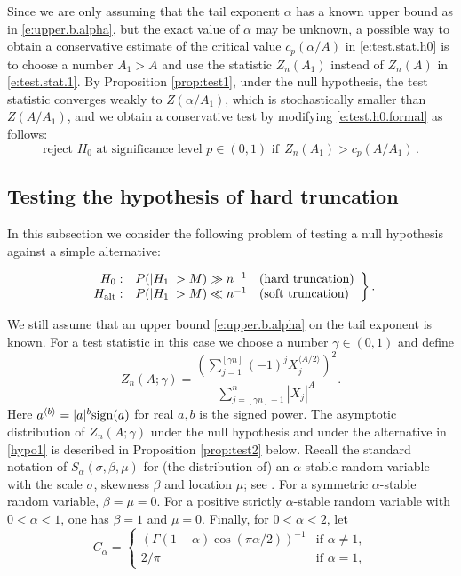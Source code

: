\documentclass[11pt]{amsart}
\numberwithin{equation}{section}
\begin{document}
Since we are only  assuming that the tail exponent
$\alpha$ has a known upper bound as in \eqref{e:upper.b.alpha}, but
the exact value of $\alpha$ may be unknown, a possible way to obtain a
conservative estimate of the critical value $c_p(\alpha/A)$ in
\eqref{e:test.stat.h0} is to choose a number $A_1>A$ and use the
statistic $Z_n(A_1)$ instead of $Z_n(A)$ in
\eqref{e:test.stat.1}. By Proposition \ref{prop:test1},
under the null hypothesis, the test statistic
converges weakly to $Z(\alpha/A_1)$, which is stochastically smaller
than $Z(A/A_1)$, and we  obtain a conservative test by
modifying \eqref{e:test.h0.formal} as follows:
\begin{equation} \label{e:test.h0.mod}
\text{reject $H_0$ at significance level $p\in (0,1)$ if} \ \
Z_n(A_1) >c_p(A/A_1)\,.
\end{equation}

\subsection{Testing the hypothesis of hard truncation}\label{test2}

In this subsection we consider the following problem of testing a null
hypothesis against a simple alternative:

\begin{equation}\label{hypo1}
\left.\begin{array}{rcl}
H_0:&P(|H_1|>M)\gg n^{-1}&\mbox{(hard truncation)}\\
H_{\rm alt}:&P(|H_1|>M)\ll n^{-1}&\mbox{(soft truncation)}
\end{array}\right\}.
\end{equation}

We still assume that an upper bound \eqref{e:upper.b.alpha} on the
tail exponent is known. For a test statistic in this case we
choose a number $\gamma\in(0,1)$ and define
\begin{equation} \label{e:test.stat.2}
Z_n(A;\gamma)=\frac{\left(\sum_{j=1}^{[\gamma
      n]}(-1)^jX_{j}^{\langle A/2\rangle}\right)^2}{\sum_{j=[\gamma
      n]+1}^n|X_{j}|^A}.
\end{equation}
Here $a^{\langle b\rangle}= |a|^b{\rm sign}(a)$ for real $a,b$ is the
signed power. The asymptotic distribution of $Z_n(A;\gamma)$
under the null hypothesis and under the alternative in \eqref{hypo1}
is described in Proposition \ref{prop:test2} below. Recall the
standard notation of $S_\alpha(\sigma,\beta,\mu)$ for (the
distribution of) an
$\alpha$-stable random variable with the scale $\sigma$, skewness
$\beta$ and location $\mu$; see \cite{samorodnitsky:taqqu:1994}. For a
symmetric $\alpha$-stable random variable, $\beta=\mu=0$. For a
positive strictly $\alpha$-stable random variable with $0<\alpha<1$,
one has $\beta=1$ and $\mu=0$. Finally, for $0<\alpha<2$, let
$$
C_\alpha = \begin{cases}
(\Gamma(1-\alpha) \cos (\pi\alpha/2))^{-1}
 &\mbox{if $\alpha\neq 1,$}\\
2/\pi &\mbox{if $\alpha =1,$}
\end{cases}
$$
\end{document}
